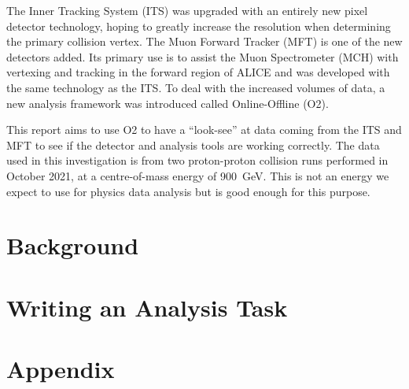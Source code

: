 \documentclass[11pt]{article}
\numberwithin{equation}{section}
\numberwithin{figure}{section}
\numberwithin{table}{section}
\begin{document}
The Inner Tracking System (ITS) was upgraded with an entirely new pixel detector technology, hoping to greatly increase the resolution when determining the primary collision vertex. The Muon Forward Tracker (MFT) is one of the new detectors added. Its primary use is to assist the Muon Spectrometer (MCH) with vertexing and tracking in the forward region of ALICE and was developed with the same technology as the ITS. To deal with the increased volumes of data, a new analysis framework was introduced called Online-Offline (O2).

This report aims to use O2 to have a ``look-see'' at data coming from the ITS and MFT to see if the detector and analysis tools are working correctly. The data used in this investigation is from two proton-proton collision runs performed in October 2021, at a centre-of-mass energy of \SI{900}{\giga\electronvolt}. This is not an energy we expect to use for physics data analysis but is good enough for this purpose.

\section{Background}\label{sec:Background}


\section{Writing an Analysis Task}\label{sec:AnalysisTask}



\newpage
\printbibliography

\newpage
\section*{Appendix}
\appendix

\end{document}
